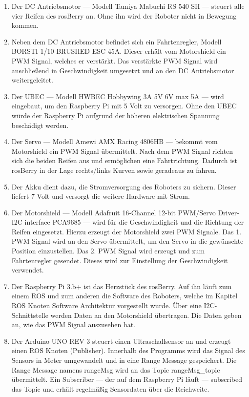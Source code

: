 \documentclass[conference]{IEEEtran}
\begin{document}
\begin{enumerate}
	\item Der DC Antriebsmotor — Modell Tamiya Mabuchi RS 540 SH — steuert alle vier Reifen des rosBerry an.
	Ohne ihn wird der Roboter nicht in Bewegung kommen.
	\item Neben dem DC Antriebsmotor befindet sich ein Fahrtenregler, Modell BORSTI 1/10 BRUSHED-ESC 45A.
	Dieser erhält vom Motorshield ein PWM Signal, welches er verstärkt.
	Das verstärkte PWM Signal wird anschließend in Geschwindigkeit umgesetzt und an den DC Antriebsmotor weitergeleitet.
	\item Der UBEC — Modell HWBEC Hobbywing 3A 5V 6V max 5A — wird eingebaut, um den Raspberry Pi mit 5 Volt zu versorgen.
	Ohne den UBEC würde der Raspberry Pi aufgrund der höheren elektrischen Spannung beschädigt werden.
	\item Der Servo — Modell Amewi AMX Racing 4806HB — bekommt vom Motorshield ein PWM Signal übermittelt.
	Nach dem PWM Signal richten sich die beiden Reifen aus und ermöglichen eine Fahrtrichtung.
	Dadurch ist rosBerry in der Lage rechts/links Kurven sowie geradeaus zu fahren.
	\item Der Akku dient dazu, die Stromversorgung des Roboters zu sichern.
	Dieser liefert 7 Volt und versorgt die weitere Hardware mit Strom.
	\item Der Motorshield — Modell Adafruit 16-Channel 12-bit PWM/Servo Driver-I2C interface PCA9685 — wird für die Geschwindigkeit und die Richtung der Reifen eingesetzt.
	Hierzu erzeugt der Motorshield zwei PWM Signale.
	Das 1. PWM Signal wird an den Servo übermittelt, um den Servo in die gewünschte Position einzustellen.
	Das 2. PWM Signal wird erzeugt und zum Fahrtenregler gesendet.
	Dieses wird zur Einstellung der Geschwindigkeit verwendet.
	\item Der Raspberry Pi 3.b+ ist das Herzstück des rosBerry.
	Auf ihn läuft zum einem ROS und zum anderen die Software des Roboters, welche im Kapitel ROS Knoten Software Architektur vorgestellt wurde.
	Über eine I2C-Schnittstelle werden Daten an den Motorshield übertragen.
	Die Daten geben an, wie das PWM Signal auszusehen hat.
	\item Der Arduino UNO REV 3 steuert einen Ultraschallsensor an und erzeugt einen ROS Knoten (Publisher).
	Innerhalb des Programms wird das Signal des Sensors in Meter umgewandelt und in eine Range Message gespeichert.
	Die Range Message namens rangeMsg wird an das Topic rangeMsg\_topic übermittelt.
	Ein Subscriber — der auf dem Raspberry Pi läuft — subscribed das Topic und erhält regelmäßig Sensordaten über die Reichweite.
	

\end{enumerate}
\end{document}
